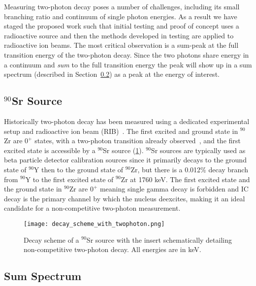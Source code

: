 \documentclass[cnatzke_thesis_proposal.tex]{subfiles}
\begin{document}
Measuring two-photon decay poses a number of challenges, including its small branching ratio and continuum of single photon energies.
As a result we have staged the proposed work such that initial testing and proof of concept uses a radioactive source and then the methods developed in testing are applied to radioactive ion beams. 
The most critical observation is a sum-peak at the full transition energy of the two-photon decay. 
Since the two photons share energy in a continuum and \textit{sum} to the full transition energy the peak will show up in a sum spectrum (described in Section~\ref{sec:sum_spectrum}) as a peak at the energy of interest.

\subsection{$^{90}$Sr Source}
Historically two-photon decay has been measured using a dedicated experimental setup and radioactive ion beam (RIB)~\cite{kramp_nuclear_1987}.
The first excited and ground state in $^{90}$Zr are $0^+$ states, with a two-photon transition already observed~\cite{schirmer_double_1984}, and the first excited state is accessible by a $^{90}$Sr source (\ref{fig:decay_scheme_with_twophoton}).
$^{90}$Sr sources are typically used as beta particle detector calibration sources since it primarily decays to the ground state of $^{90}$Y then to the ground state of $^{90}$Zr, but there is a 0.012\% decay branch from $^{90}$Y to the first excited state of $^{90}$Zr at 1760 keV.
The first excited state and the ground state in $^{90}$Zr are $0^+$ meaning single gamma decay is forbidden and IC decay is the primary channel by which the nucleus deexcites, making it an ideal candidate for a non-competitive two-photon measurement.

\begin{figure}[H]
  \centering
  \texttt{[image: decay\_scheme\_with\_twophoton.png]}
  \caption{Decay scheme of a $^{90}$Sr source with the insert schematically detailing non-competitive two-photon decay. All energies are in keV.}
  \label{fig:decay_scheme_with_twophoton}
\end{figure}

\subsection{Sum Spectrum}
\label{sec:sum_spectrum}
\end{document}
